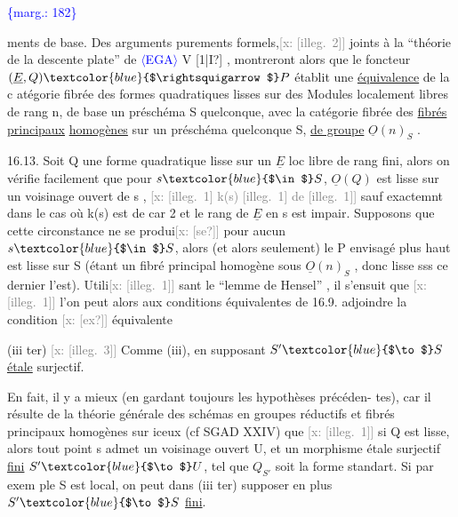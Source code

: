 \documentclass[11pt]{article}
\newcommand{\scanpage}[1]{\par\bigskip\noindent{\small\sffamily[scan #1]}\par}
\newcommand{\mspage}[1]{{\small\sffamily[p.\,#1]}}
\newcommand{\hand}[1]{\textcolor{blue}{#1}}
\newcommand{\inserted}[2][]{\textcolor{blue}{$\langle$#2$\rangle$}}
\newcommand{\margin}[1]{\textcolor{blue}{\{\textsf{marg.:} #1\}}}
\newcommand{\xout}[1]{\textcolor{gray}{[\textsf{x:} #1]}}
\newcommand{\uline}[1]{\underline{#1}}
\newcommand{\unsure}[1]{[#1?]}
\newcommand{\illegible}[1]{[\textsf{illeg.\ #1}]}
\begin{document}
\margin{\hand{182}}

\clearpage
\scanpage{25/183}
\mspage{\hand{10}.}

ments de base. Des arguments purements formels,\xout{\illegible{2}} joints à la
``théorie de la descente plate'' de \inserted{EGA} V \unsure{1|I} , montreront alors que le foncteur
$(\underline{E},Q) \hand{$\rightsquigarrow$} P$ établit une \uline{équivalence} de la c atégorie fibrée des formes
quadratiques lisses sur des Modules localement libres de rang n, de base
un préschéma S quelconque, avec la catégorie fibrée des \uline{fibrés principaux}
\uline{homogènes} sur un préschéma quelconque S, \uline{de groupe} $\underline{O}(n)_S$ .

16.13. Soit Q une forme quadratique lisse sur un $\underline{E}$ loc libre de
rang fini, alors on vérifie facilement que pour $s \hand{$\in$} S$, $\underline{O}(Q)$ est lisse
sur un voisinage ouvert de s , \xout{\illegible{1} k(s) \illegible{1} de \illegible{1}} sauf exactemnt dans
le cas où k(s) est de car 2 et le rang de $\underline{E}$ en s est impair. Supposons
que cette circonstance ne se produi\xout{\unsure{se}} pour aucun $s \hand{$\in$} S$, alors (et alors
seulement) le P envisagé plus haut est lisse sur S (étant un fibré
principal homogène sous $\underline{O}(n)_S$ , donc lisse sss ce dernier l'est). Utili\xout{\illegible{1}}
sant le ``lemme de Hensel'' , il s'ensuit que \xout{\illegible{1}} l'on peut alors aux
conditions équivalentes de 16.9. adjoindre la condition \xout{\unsure{ex}} équivalente

(iii ter) \xout{\illegible{3}} Comme (iii), en supposant $S' \hand{$\to$} S$
\uline{étale} surjectif.

En fait, il y a mieux (en gardant toujours les hypothèses précéden-%
tes), car il résulte de la théorie générale des schémas en groupes réductifs
et fibrés principaux homogènes sur iceux (cf SGAD XXIV) que \xout{\illegible{1}} si Q est
lisse, alors tout point s admet un voisinage ouvert U, et un morphisme
étale surjectif \uline{fini} $S' \hand{$\to$} U$, tel que $Q_{S'}$ soit la forme standart. Si par exem
ple S est local, on peut dans (iii ter) supposer en plus $S' \hand{$\to$} S$ \uline{fini}.
\end{document}
